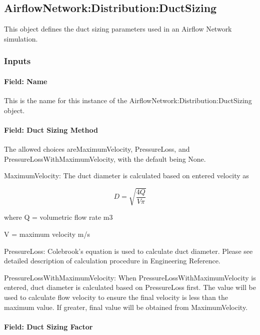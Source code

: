 \subsection{AirflowNetwork:Distribution:DuctSizing}\label{airflownetworkdistributionductsizing}

This object defines the duct sizing parameters used in an Airflow Network simulation.

\subsubsection{Inputs}\label{inputs-AFN-DuctSizing}

\paragraph{Field: Name}\label{field-name-ductsizing}

This is the name for this instance of the AirflowNetwork:Distribution:DuctSizing object.

\paragraph{Field: Duct Sizing Method}\label{duct-sizing-method}

 The allowed choices areMaximumVelocity, PressureLoss, and PressureLossWithMaximumVelocity, with the default being None.

MaximumVelocity: The duct diameter is calculated based on entered velocity as

\begin{equation}
D = \sqrt{\frac{4Q}{V \pi } } 
\end{equation}

where Q = volumetric flow rate {m3}

      V = maximum velocity {m/s}

PressureLoss: Colebrook's equation is used to calculate duct diameter. Please see detailed description of calculation procedure in Engineering Reference.

PressureLossWithMaximumVelocity: When PressureLossWithMaximumVelocity is entered, duct diameter is calculated based on PressureLoss first. The value will be used to calculate flow velocity to ensure the final velocity is less than the maximum value. If greater, final value will be obtained from MaximumVelocity.

\paragraph{Field: Duct Sizing Factor}\label{duct-sizing-factor}

